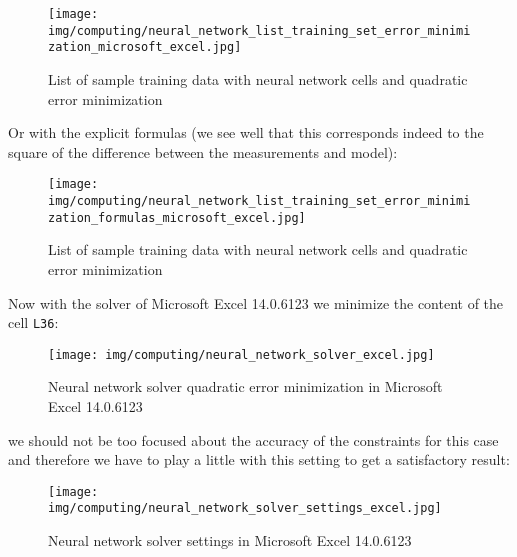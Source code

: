 	\pagebreak
	\begin{tcolorbox}[colframe=black,colback=white,sharp corners]
	\begin{figure}[H]
		\centering
		\texttt{[image: img/computing/neural\_network\_list\_training\_set\_error\_minimization\_microsoft\_excel.jpg]}
		\caption[]{List of sample training data with neural network cells and quadratic error minimization}
	\end{figure}
	Or with the explicit formulas (we see well that this corresponds indeed to the square of the difference between the measurements and model):
	\begin{figure}[H]
		\centering
		\texttt{[image: img/computing/neural\_network\_list\_training\_set\_error\_minimization\_formulas\_microsoft\_excel.jpg]}
		\caption[]{List of sample training data with neural network cells and quadratic error minimization}
	\end{figure}
	Now with the solver of Microsoft Excel 14.0.6123 we minimize the content of the cell \texttt{L36}:
	\end{tcolorbox}
	
	\pagebreak
	\begin{tcolorbox}[colframe=black,colback=white,sharp corners]
	\begin{figure}[H]
		\centering
		\texttt{[image: img/computing/neural\_network\_solver\_excel.jpg]}
		\caption[]{Neural network solver quadratic error minimization in Microsoft Excel 14.0.6123}
	\end{figure}
	we should not be too focused about the accuracy of the constraints for this case and therefore we have to play a little with this setting to get a satisfactory result:
	\begin{figure}[H]
		\centering
		\texttt{[image: img/computing/neural\_network\_solver\_settings\_excel.jpg]}
		\caption[]{Neural network solver settings in Microsoft Excel 14.0.6123}
	\end{figure}
	\end{tcolorbox}
	
